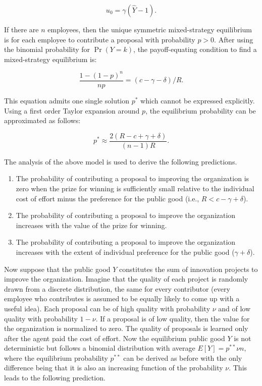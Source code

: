 \documentclass[11pt, titlepage]{article}
\begin{document}
\begin{equation}
  u_0 = \gamma (\hat Y - 1).
\end{equation}

If there are \(n\) employees, then the unique symmetric mixed-strategy
equilibrium is for each employee to contribute a proposal with
probability \(p>0\). After using the binomial probability for
\(\Pr(Y=k)\), the payoff-equating condition to find a mixed-strategy
equilibrium is:

\begin{equation} \label{eq: mixed-strategy}
  \frac{1- (1-p)^{n}}{n p} = (c- \gamma - \delta) / R.
\end{equation}

This equation admits one single solution \(p^*\) which cannot be
expressed explicitly. Using a first order Taylor expansion around \(p\),
the equilibrium probability can be approximated as follows:

\begin{equation} \label{eq: probability}
  p^*  \approx \frac{2 (R- c+\gamma +\delta )}{(n-1) R}. 
\end{equation}

The analysis of the above model is used to derive the following
predictions.

\begin{enumerate}
\def\labelenumi{\arabic{enumi})}
\item
  The probability of contributing a proposal to improving the
  organization is zero when the prize for winning is sufficiently small
  relative to the individual cost of effort minus the preference for the
  public good (i.e., \(R< c-\gamma +\delta\)).
\item
  The probability of contributing a proposal to improve the organization
  increases with the value of the prize for winning.
\item
  The probability of contributing a proposal to improve the organization
  increases with the extent of individual preference for the public good
  (\(\gamma+\delta\)).
\end{enumerate}

Now suppose that the public good \(Y\) constitutes the sum of innovation
projects to improve the organization. Imagine that the quality of each
project is randomly drawn from a discrete distribution, the same for
every contributor (every employee who contributes is assumed to be
equally likely to come up with a useful idea). Each proposal can be of
high quality with probability \(\nu\) and of low quality with
probability \(1-\nu\). If a proposal is of low quality, then the value
for the organization is normalized to zero. The quality of proposals is
learned only after the agent paid the cost of effort. Now the
equilibrium public good \(Y\) is not deterministic but follows a
binomial distribution with average \(E[Y] = p^{**} \nu n\), where the
equilibrium probability \(p^{**}\) can be derived as before with the
only difference being that it is also an increasing function of the
probability \(\nu\). This leads to the following prediction.
\end{document}
